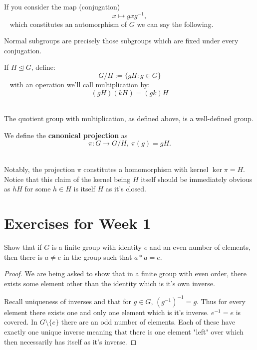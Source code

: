 If you consider the map (conjugation)
$$ 
    x \mapsto gxg^{-1},
$$ 
which constitutes an automorphism of $G$ we can say 
the following. 

Normal subgroups are precisely those subgroups which are 
fixed under every conjugation. 

\begin{defn}
    \label{defn:quotient_group}
    If $H \trianglelefteq G$, define: 
    $$ 
        G/H := \{gH : g \in G\}
    $$ 
    with an operation we'll call multiplication by: 
    $$ 
        (gH)(kH) = (gk)H
    $$ 
\end{defn}

\begin{thm}
    The quotient group with multiplication, as defined above, 
    is a well-defined group. 
\end{thm}

\newpage 
\begin{defn}
    We define the \textbf{canonical projection} as 
    $$ 
        \pi : G \to G/H, \: \pi(g) = gH.
    $$ 
\end{defn}
Notably, the projection $\pi$ constitutes 
a homomorphism with kernel $\ker \pi = H$.
Notice that this claim of the kernel being $H$ itself 
should be immediately obvious as $hH$ for some 
$h \in H$ is itself $H$ as it's closed. 

\newpage 
\section{Exercises for Week 1}
\begin{prob}[29, p.48]
    Show that if $G$ is a finite group with identity $e$ and 
    an even number of elements, then there is 
    $a \neq e$ in the group such that $a * a = e$.
\end{prob}
\begin{proof}
    We are being asked to show that in a finite group with even 
    order, there exists some element other than the identity which 
    is it's own inverse. 

    Recall uniqueness of inverses and that for $g \in G$, 
    $(g^{-1})^{-1} = g$. Thus for every element there exists one 
    and only one element which is it's inverse. $e^{-1} = e$ is 
    covered. In $G \setminus \{e\}$ there are an odd number of 
    elements. Each of these have exactly one unique inverse meaning 
    that there is one element "left" over which then necessarily 
    has itself as it's inverse. 
\end{proof}

